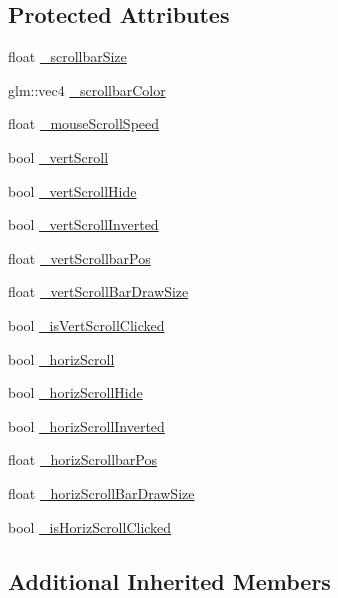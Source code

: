 \subsection*{Protected Attributes}
\begin{DoxyCompactItemize}
\item 
float \hyperlink{class_scrollbar_u_i_a6125bbe47abf1518e69299967d19b43a}{\+\_\+scrollbar\+Size}
\item 
glm\+::vec4 \hyperlink{class_scrollbar_u_i_a532e06e324461641a9cdd2555e21b1d6}{\+\_\+scrollbar\+Color}
\item 
float \hyperlink{class_scrollbar_u_i_a626bf47cfb0bea04f453029b986341e2}{\+\_\+mouse\+Scroll\+Speed}
\item 
bool \hyperlink{class_scrollbar_u_i_ab40860984252349a22993b2934618bc5}{\+\_\+vert\+Scroll}
\item 
bool \hyperlink{class_scrollbar_u_i_ab7ce5487caa9ad8b010f800e80685f57}{\+\_\+vert\+Scroll\+Hide}
\item 
bool \hyperlink{class_scrollbar_u_i_add30aeb1da25f6cd417680ab0e12652e}{\+\_\+vert\+Scroll\+Inverted}
\item 
float \hyperlink{class_scrollbar_u_i_aaae7fde079436e9b5e4d5e6d821d606d}{\+\_\+vert\+Scrollbar\+Pos}
\item 
float \hyperlink{class_scrollbar_u_i_a0b00f02fb5b54356c19955b8a8c90691}{\+\_\+vert\+Scroll\+Bar\+Draw\+Size}
\item 
bool \hyperlink{class_scrollbar_u_i_aa691ffc09f3fb8ccce56b152f5d3b2c9}{\+\_\+is\+Vert\+Scroll\+Clicked}
\item 
bool \hyperlink{class_scrollbar_u_i_a9bd912a08df25133083af2c4564033c7}{\+\_\+horiz\+Scroll}
\item 
bool \hyperlink{class_scrollbar_u_i_ad8171e1bc05ea2490927f224a572f5e0}{\+\_\+horiz\+Scroll\+Hide}
\item 
bool \hyperlink{class_scrollbar_u_i_a8c8b8580f609b0b1c264012c88d818fe}{\+\_\+horiz\+Scroll\+Inverted}
\item 
float \hyperlink{class_scrollbar_u_i_a32a55fddb165d3c81412d10203fac6c0}{\+\_\+horiz\+Scrollbar\+Pos}
\item 
float \hyperlink{class_scrollbar_u_i_ab73087b87968f26751d80fb6273218d0}{\+\_\+horiz\+Scroll\+Bar\+Draw\+Size}
\item 
bool \hyperlink{class_scrollbar_u_i_a21b11b5b749a1efb3460280ab5250950}{\+\_\+is\+Horiz\+Scroll\+Clicked}
\end{DoxyCompactItemize}
\subsection*{Additional Inherited Members}



